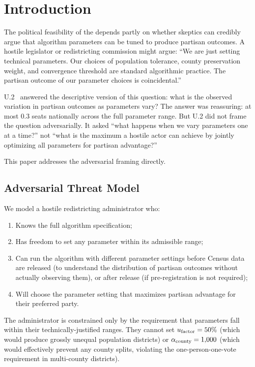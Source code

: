 \section{Introduction}
\label{sec:introduction}

The political feasibility of the \dia{} depends partly on whether
skeptics can credibly argue that algorithm parameters can be tuned
to produce partisan outcomes.
A hostile legislator or redistricting commission might argue: ``We are
just setting technical parameters.
Our choices of population tolerance, county preservation weight, and
convergence threshold are standard algorithmic practice.
The partisan outcome of our parameter choices is coincidental.''

U.2~\citep{b17paper} answered the descriptive version of this question:
what is the observed variation in partisan outcomes as parameters vary?
The answer was reassuring: at most 0.3 seats nationally across the full
parameter range.
But U.2 did not frame the question adversarially.
It asked ``what happens when we vary parameters one at a time?'' not
``what is the maximum a hostile actor can achieve by jointly optimizing
all parameters for partisan advantage?''

This paper addresses the adversarial framing directly.

\subsection{Adversarial Threat Model}

We model a hostile redistricting administrator who:
\begin{enumerate}
\item Knows the full \bisect{} algorithm specification;
\item Has freedom to set any parameter within its admissible range;
\item Can run the algorithm with different parameter settings before
  Census data are released (to understand the distribution of partisan
  outcomes without actually observing them), or after release
  (if pre-registration is not required);
\item Will choose the parameter setting that maximizes partisan advantage
  for their preferred party.
\end{enumerate}

The administrator is constrained only by the requirement that parameters
fall within their technically-justified ranges.
They cannot set $u_{\mathrm{factor}} = 50\%$ (which would produce grossly
unequal population districts) or $\alpha_{\mathrm{county}} = 1{,}000$ (which would
effectively prevent any county splits, violating the one-person-one-vote
requirement in multi-county districts).

